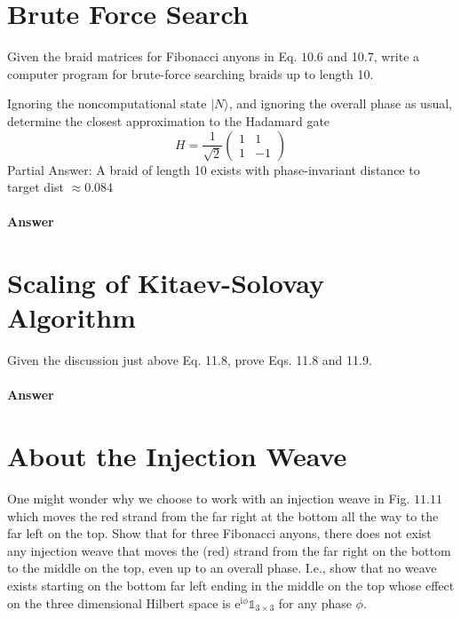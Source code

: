 \documentclass{book}
\begin{document}
\section{Brute Force Search}
Given the braid matrices for Fibonacci anyons in Eq. $10.6$ and 10.7, write a computer program for brute-force searching braids up to length 10.



Ignoring the noncomputational state $|N\rangle $, and ignoring the overall phase as usual, determine the closest approximation to the Hadamard gate
\begin{equation*}
H=\frac{1}{\sqrt{2}}\begin{pmatrix}
1 & 1\\
1 & -1
\end{pmatrix}
\end{equation*}
Partial Answer: A braid of length 10 exists with phase-invariant distance to target dist $\approx 0.084$

\paragraph{Answer}

\section{Scaling of Kitaev-Solovay Algorithm}
Given the discussion just above Eq. 11.8, prove Eqs. 11.8 and 11.9.

\paragraph{Answer}

\section{About the Injection Weave}
One might wonder why we choose to work with an injection weave in Fig. $11.11$ which moves the red strand from the far right at the bottom all the way to the far left on the top. Show that for three Fibonacci anyons, there does not exist any injection weave that moves the (red) strand from the far right on the bottom to the middle on the top, even up to an overall phase. I.e., show that no weave exists starting on the bottom far left ending in the middle on the top whose effect on the three dimensional Hilbert space is $\mathrm{e}^{\mathrm{i} \phi }\mathds{1}_{3\times 3}$ for any phase $\phi $.
\end{document}
